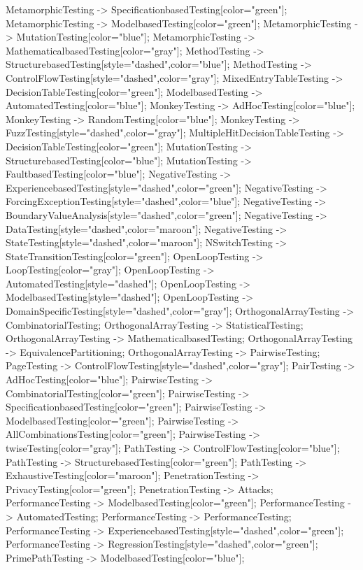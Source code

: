 \documentclass{article}
\begin{document}
{MetamorphicTesting -> SpecificationbasedTesting[color="green"];
MetamorphicTesting -> ModelbasedTesting[color="green"];
MetamorphicTesting -> MutationTesting[color="blue"];
MetamorphicTesting -> MathematicalbasedTesting[color="gray"];
MethodTesting -> StructurebasedTesting[style="dashed",color="blue"];
MethodTesting -> ControlFlowTesting[style="dashed",color="gray"];
MixedEntryTableTesting -> DecisionTableTesting[color="green"];
ModelbasedTesting -> AutomatedTesting[color="blue"];
MonkeyTesting -> AdHocTesting[color="blue"];
MonkeyTesting -> RandomTesting[color="blue"];
MonkeyTesting -> FuzzTesting[style="dashed",color="gray"];
MultipleHitDecisionTableTesting -> DecisionTableTesting[color="green"];
MutationTesting -> StructurebasedTesting[color="blue"];
MutationTesting -> FaultbasedTesting[color="blue"];
NegativeTesting -> ExperiencebasedTesting[style="dashed",color="green"];
NegativeTesting -> ForcingExceptionTesting[style="dashed",color="blue"];
NegativeTesting -> BoundaryValueAnalysis[style="dashed",color="green"];
NegativeTesting -> DataTesting[style="dashed",color="maroon"];
NegativeTesting -> StateTesting[style="dashed",color="maroon"];
NSwitchTesting -> StateTransitionTesting[color="green"];
OpenLoopTesting -> LoopTesting[color="gray"];
OpenLoopTesting -> AutomatedTesting[style="dashed"];
OpenLoopTesting -> ModelbasedTesting[style="dashed"];
OpenLoopTesting -> DomainSpecificTesting[style="dashed",color="gray"];
OrthogonalArrayTesting -> CombinatorialTesting;
OrthogonalArrayTesting -> StatisticalTesting;
OrthogonalArrayTesting -> MathematicalbasedTesting;
OrthogonalArrayTesting -> EquivalencePartitioning;
OrthogonalArrayTesting -> PairwiseTesting;
PageTesting -> ControlFlowTesting[style="dashed",color="gray"];
PairTesting -> AdHocTesting[color="blue"];
PairwiseTesting -> CombinatorialTesting[color="green"];
PairwiseTesting -> SpecificationbasedTesting[color="green"];
PairwiseTesting -> ModelbasedTesting[color="green"];
PairwiseTesting -> AllCombinationsTesting[color="green"];
PairwiseTesting -> twiseTesting[color="gray"];
PathTesting -> ControlFlowTesting[color="blue"];
PathTesting -> StructurebasedTesting[color="green"];
PathTesting -> ExhaustiveTesting[color="maroon"];
PenetrationTesting -> PrivacyTesting[color="green"];
PenetrationTesting -> Attacks;
PerformanceTesting -> ModelbasedTesting[color="green"];
PerformanceTesting -> AutomatedTesting;
PerformanceTesting -> PerformanceTesting;
PerformanceTesting -> ExperiencebasedTesting[style="dashed",color="green"];
PerformanceTesting -> RegressionTesting[style="dashed",color="green"];
PrimePathTesting -> ModelbasedTesting[color="blue"];
}
\end{document}
